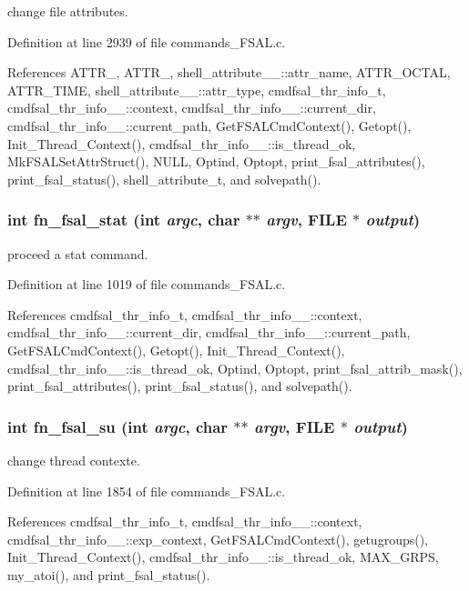 change file attributes. 

Definition at line 2939 of file commands\_\-FSAL.c.

References ATTR\_, ATTR\_, shell\_\-attribute\_\-\_\-::attr\_\-name, ATTR\_\-OCTAL, ATTR\_\-TIME, shell\_\-attribute\_\-\_\-::attr\_\-type, cmdfsal\_\-thr\_\-info\_\-t, cmdfsal\_\-thr\_\-info\_\-\_\-::context, cmdfsal\_\-thr\_\-info\_\-\_\-::current\_\-dir, cmdfsal\_\-thr\_\-info\_\-\_\-::current\_\-path, Get\-FSALCmd\-Context(), Getopt(), Init\_\-Thread\_\-Context(), cmdfsal\_\-thr\_\-info\_\-\_\-::is\_\-thread\_\-ok, Mk\-FSALSet\-Attr\-Struct(), NULL, Optind, Optopt, print\_\-fsal\_\-attributes(), print\_\-fsal\_\-status(), shell\_\-attribute\_\-t, and solvepath().
\subsubsection{\setlength{\rightskip}{0pt plus 5cm}int fn\_\-fsal\_\-stat (int {\em argc}, char $\ast$$\ast$ {\em argv}, FILE $\ast$ {\em output})}\label{commands_8h_a9}


proceed a stat command. 

Definition at line 1019 of file commands\_\-FSAL.c.

References cmdfsal\_\-thr\_\-info\_\-t, cmdfsal\_\-thr\_\-info\_\-\_\-::context, cmdfsal\_\-thr\_\-info\_\-\_\-::current\_\-dir, cmdfsal\_\-thr\_\-info\_\-\_\-::current\_\-path, Get\-FSALCmd\-Context(), Getopt(), Init\_\-Thread\_\-Context(), cmdfsal\_\-thr\_\-info\_\-\_\-::is\_\-thread\_\-ok, Optind, Optopt, print\_\-fsal\_\-attrib\_\-mask(), print\_\-fsal\_\-attributes(), print\_\-fsal\_\-status(), and solvepath().
\subsubsection{\setlength{\rightskip}{0pt plus 5cm}int fn\_\-fsal\_\-su (int {\em argc}, char $\ast$$\ast$ {\em argv}, FILE $\ast$ {\em output})}\label{commands_8h_a12}


change thread contexte. 

Definition at line 1854 of file commands\_\-FSAL.c.

References cmdfsal\_\-thr\_\-info\_\-t, cmdfsal\_\-thr\_\-info\_\-\_\-::context, cmdfsal\_\-thr\_\-info\_\-\_\-::exp\_\-context, Get\-FSALCmd\-Context(), getugroups(), Init\_\-Thread\_\-Context(), cmdfsal\_\-thr\_\-info\_\-\_\-::is\_\-thread\_\-ok, MAX\_\-GRPS, my\_\-atoi(), and print\_\-fsal\_\-status().
